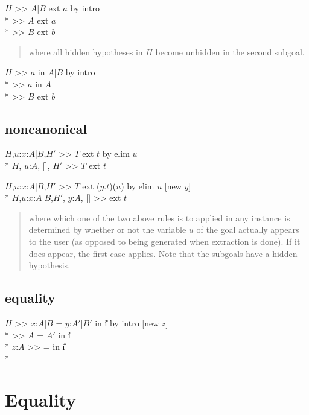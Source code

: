 \goal $H$ >> \lc $A$|$B$\rc{} ext $a$ by intro \\*
\subgoal >> $A$ ext $a$ \\*
\subgoal >> $B$ ext $b$
\begin{quote}\rm where all hidden hypotheses in $H$ become unhidden in the second
subgoal.
\end{quote}

\goal $H$ >> $a$ in \lc $A$|$B$\rc{} by intro\\*
\subgoal >> $a$ in $A$ \\*
\subgoal >> $B$ ext $b$


\subsection*{noncanonical}
\goalgroup $H$,$u$:\lc $x$:$A$|$B$\rc,$H'$ >> $T$ ext $t$ by elim $u$ \\*
\subgoal $H$, $u$:$A$, [], $H'$ >> $T$ ext $t$

\goalskip

\goal $H$,$u$:\lc $x$:$A$|$B$\rc,$H'$ >> $T$ 
                 ext (\bs $y$.$t$)($u$) 
                 by elim $u$ [new $y$] \\*
\subgoal $H$,$u$:\lc $x$:$A$|$B$\rc,$H'$, $y$:$A$, [] >> 
                   ext $t$

\begin{quote}\rm
where which one of the two above rules 
is to applied in any instance is determined by
whether or not the variable $u$ of the goal actually appears to the user
(as opposed to being generated when extraction is done).  If it does
appear, the first case applies.  Note that the subgoals have a hidden
hypothesis.
\end{quote}

\subsection*{equality}
\goal $H$ >> \lc$x$:$A$|$B$\rc{} =  \lc$y$:$A'$|$B'$\rc{}
             in \U{i} by intro [new $z$] \\*
\subgoal >> $A$ = $A'$ in \U{i} \\*
\subgoal $z$:$A$ >>  =  in \U{i} \\*

\par

\section{Equality}
